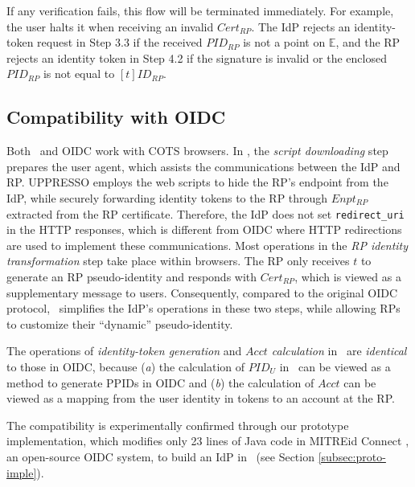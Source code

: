 If any verification fails, this flow will be terminated immediately.
For example, the user halts it when receiving an invalid $Cert_{RP}$.
\newc
The IdP rejects an identity-token request in Step 3.3 if the received $PID_{RP}$ is not a point on $\mathbb{E}$, and the RP rejects an identity token in Step 4.2 if the signature is invalid or the enclosed $PID_{RP}$ is not equal to $[t]ID_{RP}$.
\oldc


\subsection{Compatibility with OIDC}
\label{subsec:compatible}

Both \usso\ and OIDC work with COTS browsers. %
In \usso, the \emph{script downloading} step prepares the user agent, which assists the communications between the IdP and RP. UPPRESSO employs the web scripts to hide the RP's endpoint from the IdP, while securely forwarding identity tokens to the RP through $Enpt_{RP}$ extracted from the RP certificate.
Therefore, the IdP does not set \verb+redirect_uri+ in the HTTP responses, which is different from OIDC where HTTP redirections are used to implement these communications. Most operations in the \emph{RP identity transformation} step take place within browsers. The RP only receives $t$ to generate an RP pseudo-identity and responds with $Cert_{RP}$,
which is viewed as a supplementary message to users.
Consequently, compared to the original OIDC protocol, \usso\ simplifies the IdP's operations in these two steps, while allowing RPs to customize their ``dynamic'' pseudo-identity.

The operations of \emph{identity-token generation} and \emph{$Acct$ calculation} in \usso\ are \emph{identical} to those in OIDC,
 because (\emph{a}) the calculation of $PID_U$ in \usso\ can be viewed as a method to generate PPIDs in OIDC and (\emph{b}) the calculation of $Acct$ can be viewed as a mapping from the user identity in tokens to an account at the RP.

The compatibility is experimentally confirmed through our prototype implementation, which modifies only 23 lines of Java code in MITREid Connect \cite{MITREid}, an open-source OIDC system, to build an IdP in \usso\ (see Section \ref{subsec:proto-imple}).

